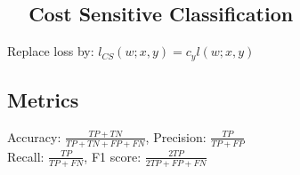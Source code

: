 \subsection*{ ~~Cost Sensitive Classification}

Replace loss by: $l_{CS}(w;x,y) = c_y l(w;x,y)$

\subsection*{Metrics}
Accuracy: $\frac{TP+TN}{TP+TN+FP+FN}$, Precision: $\frac{TP}{TP+FP}$\\ Recall: $\frac{TP}{TP+FN}$, F1 score: $\frac{2TP}{2TP+FP+FN}$